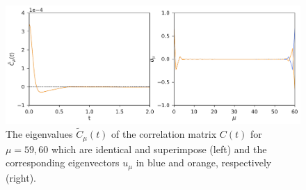 \documentclass[b5paper,openright,11pt]{book}
\begin{document}
\begin{figure}[h!]
  \centering
\includegraphics[width=\linewidth]{EigenvaluesVectors-WALLS-66nodes}
\caption[Eigenvalues and eigenvectors near the walls for 66 nodes.]{The eigenvalues $\tilde{C}_{\mu}(t)$ of the correlation matrix $C(t)$ for $\mu=59,60$ which are identical and superimpose (left) and the corresponding eigenvectors $u_{\mu}$ in blue and orange, respectively (right).}
\label{fig:EigenvaluesVectors-WALLS-66nodes}
\end{figure}
\end{document}
